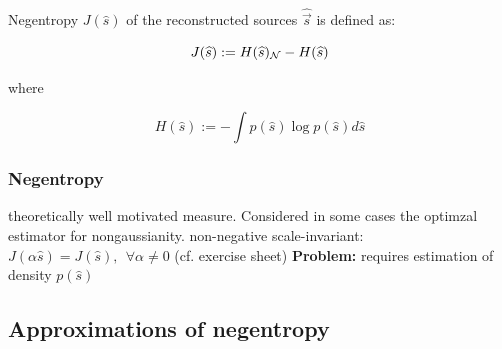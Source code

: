 \newpage

Negentropy $J(\widehat{s})$ of the reconstructed sources $\widehat{\vec s}$ is defined as:

\begin{equation}
\label{eq:negentropy}
	J(\widehat{s}) := H(\widehat{s})_{\mathcal{N}} - H(\widehat{s})
\end{equation}

where

\begin{equation}
\label{eq:diffentropyshat}
H(\widehat{s}) := - \int p(\widehat{s}) \log p(\widehat{s}) d\widehat{s}
\end{equation}

\begin{frame} 
\frametitle{Negentropy}


\begin{itemize}
  \itR theoretically well motivated measure. Considered in some cases the optimzal estimator for nongaussianity.
  \itR non-negative
  \itR scale-invariant: $J(\alpha \widehat{s}) = J(\widehat{s}), \ \ \forall \alpha \ne 0$ (cf. exercise sheet)
  \itR \textbf{Problem:} requires estimation of density $p(\widehat{s})$
\end{itemize}


\end{frame}

\subsection{Approximations of negentropy}

